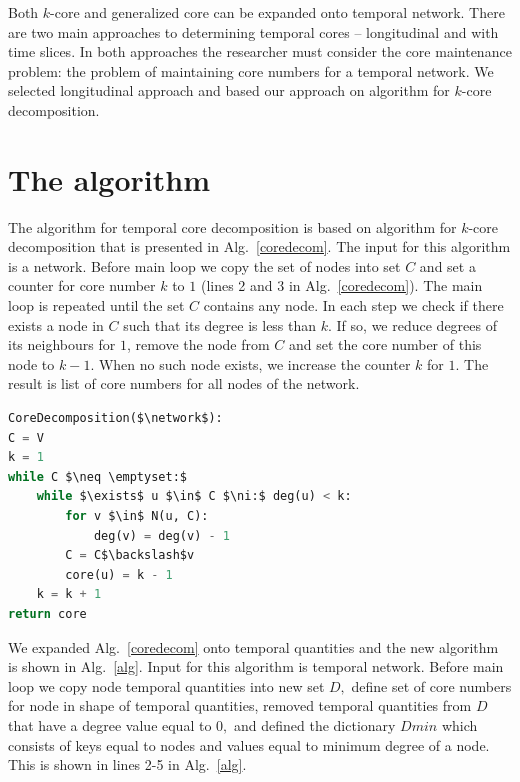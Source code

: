 \documentclass[a4paper,twoside,10pt]{article}
\newcommand{\network}{\mathcal{N}}
\begin{document}
Both $k$-core and generalized core can be expanded onto temporal network. There are two main approaches to determining temporal cores -- longitudinal and with time slices. In both approaches the researcher must consider the core maintenance problem: the problem of maintaining core numbers for a temporal network. We selected longitudinal approach and based our approach on algorithm for $k$-core decomposition.




%
%
\section{The algorithm}\label{algorithm}

The algorithm for temporal core decomposition is based on algorithm for $k$-core decomposition that is presented in Alg.~\ref{coredecom}. The input for this algorithm is a network. Before main loop we copy the set of nodes into set $C$ and set a counter for core number $k$ to $1$ (lines 2 and 3 in Alg.~\ref{coredecom}). The main loop is repeated until the set $C$ contains any node. In each step we check if there exists a node in $C$ such that its degree is less than $k$. If so, we reduce degrees of its neighbours for $1$, remove the node from $C$ and set the core number of this node to $k-1.$ When no such node exists, we increase the counter $k$ for $1.$ The result is list of core numbers for all nodes of the network.

\begin{lstlisting}[mathescape, language=Python, caption={Core decomposition algorithm.}, label={coredecom}]
CoreDecomposition($\network$):
C = V
k = 1
while C $\neq \emptyset:$
	while $\exists$ u $\in$ C $\ni:$ deg(u) < k:
		for v $\in$ N(u, C):
			deg(v) = deg(v) - 1
		C = C$\backslash$v
		core(u) = k - 1
	k = k + 1
return core
\end{lstlisting}

We expanded Alg.~\ref{coredecom} onto temporal quantities and the new algorithm is shown in Alg.~\ref{alg}. Input for this algorithm is temporal network. Before main loop we copy node temporal quantities into new set $D,$ define set of core numbers for node in shape of temporal quantities, removed temporal quantities from $D$ that have a degree value equal to $0,$ and defined the dictionary $Dmin$ which consists of keys equal to nodes and values equal to minimum degree of a node. This is shown in lines 2-5 in Alg.~\ref{alg}.
\end{document}
